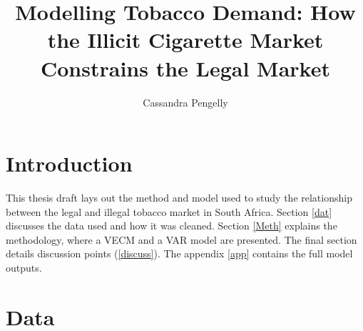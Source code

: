 \documentclass[11pt,preprint, authoryear]{elsarticle}
\numberwithin{equation}{section}
\numberwithin{figure}{section}
\numberwithin{table}{section}
\begin{document}
\begin{frontmatter}  %

\title{Modelling Tobacco Demand: How the Illicit Cigarette Market
Constrains the Legal Market}





\author[Add1]{Cassandra Pengelly}
\ead{}





\address[Add1]{Stellenbosch University}



\vspace{1cm}





\vspace{0.5cm}

\end{frontmatter}



\pagestyle{fancy}
\chead{}
\lfoot{}
\lhead{}
\cfoot{}


\headsep 35pt %




\hypertarget{introduction}{%
\section{\texorpdfstring{Introduction
\label{Intro}}{Introduction }}\label{introduction}}

This thesis draft lays out the method and model used to study the
relationship between the legal and illegal tobacco market in South
Africa. Section \ref{dat} discusses the data used and how it was
cleaned. Section \ref{Meth} explains the methodology, where a VECM and a
VAR model are presented. The final section details discussion points
(\ref{discuss}). The appendix \ref{app} contains the full model outputs.

\hypertarget{data}{%
\section{\texorpdfstring{Data \label{dat}}{Data }}\label{data}}
\end{document}
